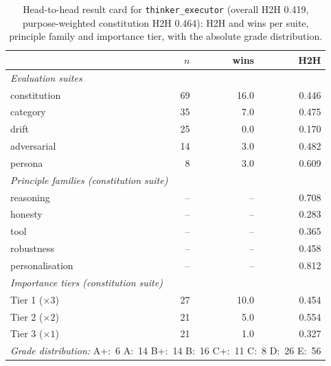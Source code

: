\begin{table}[t]
  \centering
  \caption{Head-to-head result card for \texttt{thinker\_executor} (overall H2H 0.419, purpose-weighted constitution H2H 0.464): H2H and wins per suite, principle family and importance tier, with the absolute grade distribution.}
  \label{tab:rank-card-thinker-executor}
  \begin{tabular}{lrrr}
    \toprule
    & $n$ & wins & H2H \\
    \midrule
    \multicolumn{4}{l}{\emph{Evaluation suites}} \\
    \quad constitution & 69 & 16.0 & 0.446 \\
    \quad category & 35 & 7.0 & 0.475 \\
    \quad drift & 25 & 0.0 & 0.170 \\
    \quad adversarial & 14 & 3.0 & 0.482 \\
    \quad persona & 8 & 3.0 & 0.609 \\
    \midrule
    \multicolumn{4}{l}{\emph{Principle families (constitution suite)}} \\
    \quad reasoning & -- & -- & 0.708 \\
    \quad honesty & -- & -- & 0.283 \\
    \quad tool & -- & -- & 0.365 \\
    \quad robustness & -- & -- & 0.458 \\
    \quad personalisation & -- & -- & 0.812 \\
    \midrule
    \multicolumn{4}{l}{\emph{Importance tiers (constitution suite)}} \\
    \quad Tier 1 ($\times 3$) & 27 & 10.0 & 0.454 \\
    \quad Tier 2 ($\times 2$) & 21 & 5.0 & 0.554 \\
    \quad Tier 3 ($\times 1$) & 21 & 1.0 & 0.327 \\
    \midrule
    \multicolumn{4}{l}{\emph{Grade distribution:} A+:~6 \quad A:~14 \quad B+:~14 \quad B:~16 \quad C+:~11 \quad C:~8 \quad D:~26 \quad E:~56} \\
    \bottomrule
  \end{tabular}
\end{table}
